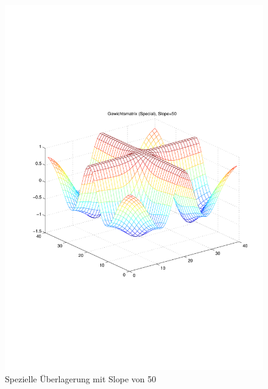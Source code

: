 \begin{figure}[hbt]
\begin{minipage}{0.5 \textwidth}
		\includegraphics[width=\textwidth]{./Bilder/Auswertung/Gewichtsmatrix/Gewichtsmatrix_Special_Slope_50}
		\caption{Spezielle Überlagerung mit Slope von 50}
		\label{Spezl50}
	\end{minipage}
\end{figure}

